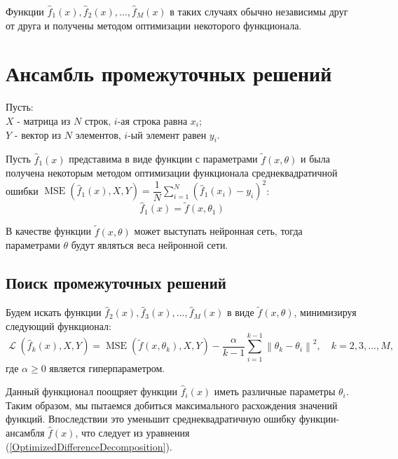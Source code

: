 \documentclass[12pt, fleqn]{article}
\newcommand{\norm}[1]{\left\lVert#1\right\rVert}
\newcommand{\loss}{\mathop{\mathcal{L}}}
\newcommand{\mse}{\mathop{MSE}}
\newcommand{\predictionfunction}{\hat{f}}
\newcommand{\optimizationmethodfunction}{\tilde{f}}
\newcommand{\distinguishparameter}{\alpha}
\newcommand{\objects}{X}
\newcommand{\results}{Y}
\newcommand{\numberobjects}{N}
\newcommand{\numberpredictionfunctions}{M}
\newcommand{\for}[3]{\sum\limits_{#1 = #2}^{#3}}  %
\newcommand{\forn}[2]{\for{#1}{1}{#2}}  %
\newcommand{\many}[3]{#1 1 #2, #1 2 #2, \dots, #1 #3 #2}  %
\newcommand{\reference}[1]{(\hyperref[#1]{\ref{#1}})}
\begin{document}
Функции $\many{\predictionfunction_}{(x)}{\numberpredictionfunctions}$ в таких случаях обычно независимы друг от друга и получены методом оптимизации некоторого функционала.

\section{Ансамбль промежуточных решений}

Пусть:\\
$\objects$ - матрица из $\numberobjects$ строк, $i$-ая строка равна $x_i$;\\
$\results$ - вектор из $\numberobjects$ элементов, $i$-ый элемент равен $y_i$.

Пусть $\predictionfunction_1(x)$ представима в виде функции с параметрами $\optimizationmethodfunction(x, \theta)$ и была получена некоторым методом оптимизации функционала среднеквадратичной ошибки
$\mse(\predictionfunction_1(x), \objects, \results) = \dfrac{1}{\numberobjects}\forn{i}{\numberobjects} (\predictionfunction_1(x_i) - y_i)^2$:
$$\predictionfunction_1(x) = \optimizationmethodfunction(x, \theta_1)$$

В качестве функции $\optimizationmethodfunction(x, \theta)$ может выступать нейронная сеть, тогда параметрами $\theta$ будут являться веса нейронной сети.

\subsection{Поиск промежуточных решений}

Будем искать функции $\predictionfunction_2(x), \predictionfunction_3(x), \dots, \predictionfunction_\numberpredictionfunctions(x)$ в виде $\optimizationmethodfunction(x, \theta)$, минимизируя следующий функционал:
\begin{equation}\label{equation:lossfunction}
\loss(\predictionfunction_k(x), \objects, \results) = \mse(\optimizationmethodfunction(x, \theta_k), \objects, \results) -
\dfrac{\distinguishparameter}{k - 1}
\forn{i}{k - 1}\norm{\theta_k - \theta_i}^2, \quad k = 2, 3, \dots, \numberpredictionfunctions,
\end{equation}
где $\distinguishparameter \geq 0$ является гиперпараметром.

Данный функционал поощряет функции $\predictionfunction_i(x)$ иметь различные параметры $\theta_i$. Таким образом, мы пытаемся добиться максимального расхождения значений функций. Впоследствии это уменьшит среднеквадратичную ошибку функции-ансамбля $\predictionfunction(x)$, что следует из уравнения \reference{OptimizedDifferenceDecomposition}.
\end{document}
